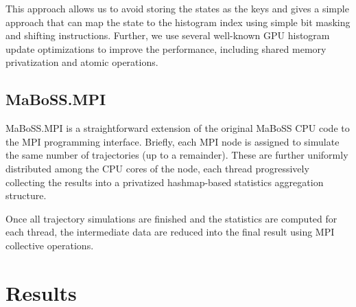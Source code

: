 \documentclass[sn-mathphys-num]{sn-jnl}%
\begin{document}
This approach allows us to avoid storing the states as the keys and gives a simple approach that can map the state to the histogram index using simple bit masking and shifting instructions. Further, we use several well-known GPU histogram update optimizations to improve the performance, including shared memory privatization and atomic operations.

\subsection{MaBoSS.MPI}

MaBoSS.MPI is a straightforward extension of the original MaBoSS CPU code to the MPI programming interface.
Briefly, each MPI node is assigned to simulate the same number of trajectories (up to a remainder). These are further uniformly distributed among the CPU cores of the node, each thread progressively collecting the results into a privatized hashmap-based statistics aggregation structure. 

Once all trajectory simulations are finished and the statistics are computed for each thread, the intermediate data are reduced into the final result using MPI collective operations.




\section{Results}
\end{document}
